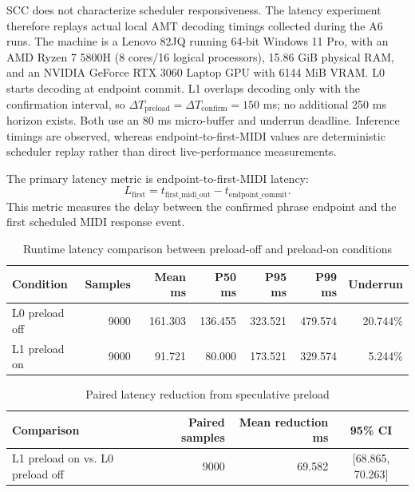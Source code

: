 \documentclass[11pt,a4paper]{article}
\begin{document}
SCC does not characterize scheduler responsiveness. The latency experiment therefore replays actual local AMT decoding timings collected during the A6 runs. The machine is a Lenovo 82JQ running 64-bit Windows 11 Pro, with an AMD Ryzen 7 5800H (8 cores/16 logical processors), 15.86 GiB physical RAM, and an NVIDIA GeForce RTX 3060 Laptop GPU with 6144 MiB VRAM. L0 starts decoding at endpoint commit. L1 overlaps decoding only with the confirmation interval, so $\Delta T_{\mathrm{preload}}=\Delta T_{\mathrm{confirm}}=150$ ms; no additional 250 ms horizon exists. Both use an 80 ms micro-buffer and underrun deadline. Inference timings are observed, whereas endpoint-to-first-MIDI values are deterministic scheduler replay rather than direct live-performance measurements.

The primary latency metric is endpoint-to-first-MIDI latency:
\begin{equation}
L_{\mathrm{first}} = t_{\mathrm{first\_midi\_out}} - t_{\mathrm{endpoint\_commit}}.
\end{equation}
This metric measures the delay between the confirmed phrase endpoint and the first scheduled MIDI response event.

\begin{table}[htbp]
\centering
\caption{Runtime latency comparison between preload-off and preload-on conditions}
\label{tab:latency-condition}
\small
\setlength{\tabcolsep}{4pt}
\begin{tabular}{lrrrrrr}
\toprule
Condition & Samples & Mean ms & P50 ms & P95 ms & P99 ms & Underrun \\
\midrule
L0 preload off & 9000 & 161.303 & 136.455 & 323.521 & 479.574 & 20.744\% \\
L1 preload on & 9000 & 91.721 & 80.000 & 173.521 & 329.574 & 5.244\% \\
\bottomrule
\end{tabular}
\end{table}

\begin{table}[htbp]
\centering
\caption{Paired latency reduction from speculative preload}
\label{tab:preload-paired-reduction}
\small
\setlength{\tabcolsep}{5pt}
\begin{tabular}{lrrc}
\toprule
Comparison & Paired samples & Mean reduction ms & 95\% CI \\
\midrule
L1 preload on vs. L0 preload off & 9000 & 69.582 & [68.865, 70.263] \\
\bottomrule
\end{tabular}
\end{table}
\end{document}
